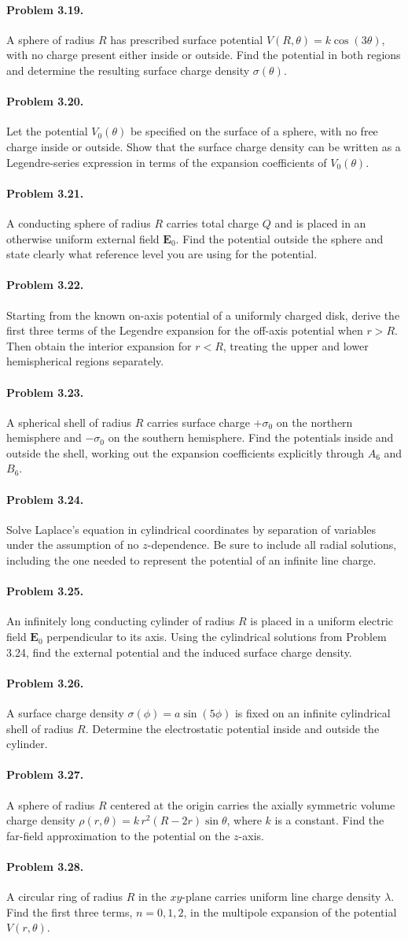 \documentclass{aa}
\newcommand{\problemstatement}[2]{%
\paragraph{Problem #1.}#2\par\medskip
}
\begin{document}
\problemstatement{3.19}{A sphere of radius \(R\) has prescribed surface potential \(V(R,\theta)=k\cos(3\theta)\), with no charge present either inside or outside. Find the potential in both regions and determine the resulting surface charge density \(\sigma(\theta)\).}
\problemstatement{3.20}{Let the potential \(V_0(\theta)\) be specified on the surface of a sphere, with no free charge inside or outside. Show that the surface charge density can be written as a Legendre-series expression in terms of the expansion coefficients of \(V_0(\theta)\).}
\problemstatement{3.21}{A conducting sphere of radius \(R\) carries total charge \(Q\) and is placed in an otherwise uniform external field \(\mathbf{E}_0\). Find the potential outside the sphere and state clearly what reference level you are using for the potential.}
\problemstatement{3.22}{Starting from the known on-axis potential of a uniformly charged disk, derive the first three terms of the Legendre expansion for the off-axis potential when \(r>R\). Then obtain the interior expansion for \(r<R\), treating the upper and lower hemispherical regions separately.}
\problemstatement{3.23}{A spherical shell of radius \(R\) carries surface charge \(+\sigma_0\) on the northern hemisphere and \(-\sigma_0\) on the southern hemisphere. Find the potentials inside and outside the shell, working out the expansion coefficients explicitly through \(A_6\) and \(B_6\).}
\problemstatement{3.24}{Solve Laplace's equation in cylindrical coordinates by separation of variables under the assumption of no \(z\)-dependence. Be sure to include all radial solutions, including the one needed to represent the potential of an infinite line charge.}
\problemstatement{3.25}{An infinitely long conducting cylinder of radius \(R\) is placed in a uniform electric field \(\mathbf{E}_0\) perpendicular to its axis. Using the cylindrical solutions from Problem 3.24, find the external potential and the induced surface charge density.}
\problemstatement{3.26}{A surface charge density \(\sigma(\phi)=a\sin(5\phi)\) is fixed on an infinite cylindrical shell of radius \(R\). Determine the electrostatic potential inside and outside the cylinder.}
\problemstatement{3.27}{A sphere of radius \(R\) centered at the origin carries the axially symmetric volume charge density \(\rho(r,\theta)=k\,r^2(R-2r)\sin\theta\), where \(k\) is a constant. Find the far-field approximation to the potential on the \(z\)-axis.}
\problemstatement{3.28}{A circular ring of radius \(R\) in the \(xy\)-plane carries uniform line charge density \(\lambda\). Find the first three terms, \(n=0,1,2\), in the multipole expansion of the potential \(V(r,\theta)\).}
\end{document}
